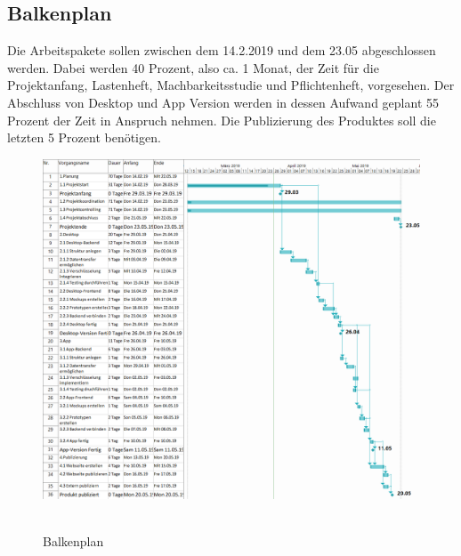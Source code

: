 \subsection{Balkenplan}
Die Arbeitspakete sollen zwischen dem 14.2.2019 und dem 23.05 abgeschlossen werden. Dabei werden 40 Prozent, also ca. 1 Monat, der Zeit für die Projektanfang, Lastenheft, Machbarkeitsstudie und Pflichtenheft, vorgesehen. Der Abschluss von Desktop und App Version werden in dessen Aufwand geplant 55 Prozent der Zeit in Anspruch nehmen. Die Publizierung des Produktes soll die letzten 5 Prozent benötigen.\\
\begin{figure}[H]
\centering
\includegraphics[width=\linewidth]{pictures/8.Projektorganisation/balkenplan.png}\
\caption{Balkenplan}
\end{figure}
\newpage
